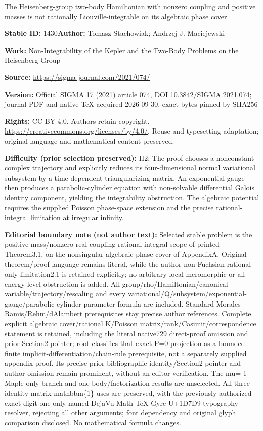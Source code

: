 \documentclass[11pt]{article}
\numberwithin{equation}{section}
\numberwithin{equation}{section}
\begin{document}
\begin{center}\Large The Heisenberg-group two-body Hamiltonian with nonzero coupling and positive masses is not rationally Liouville-integrable on its algebraic phase cover\end{center}
\noindent\textbf{Stable ID:} 1430\quad\textbf{Author:} Tomasz Stachowiak; Andrzej J. Maciejewski\par
\noindent\textbf{Work:} Non-Integrability of the Kepler and the Two-Body Problems on the Heisenberg Group\par
\noindent\textbf{Source:} \url{https://sigma-journal.com/2021/074/}\par
\noindent\textbf{Version:} Official SIGMA 17 (2021) article 074, DOI 10.3842/SIGMA.2021.074; journal PDF and native TeX acquired 2026-09-30, exact bytes pinned by SHA256\par
\noindent\textbf{Rights:} CC BY 4.0. Authors retain copyright. \url{https://creativecommons.org/licenses/by/4.0/}. Reuse and typesetting adaptation; original language and mathematical content preserved.\par
\noindent\textbf{Difficulty (prior selection preserved):} {\CJKfont H2: The proof chooses a nonconstant complex trajectory and explicitly reduces its four-dimensional normal variational subsystem by a time-dependent triangularizing matrix. An exponential gauge then produces a parabolic-cylinder equation with non-solvable differential Galois identity component, yielding the integrability obstruction. The algebraic potential requires the supplied Poisson phase-space extension and the precise rational-integral limitation at irregular infinity.}\par
\medskip\noindent\textbf{Editorial boundary note (not author text):} Selected stable problem is the positive-mass/nonzero real coupling rational-integral scope of printed Theorem3.1, on the nonsingular algebraic phase cover of AppendixA. Original theorem/proof language remains literal, while the author non-Fuchsian rational-only limitation2.1 is retained explicitly; no arbitrary local-meromorphic or all-energy-level obstruction is added. All group/rho/Hamiltonian/canonical variable/trajectory/rescaling and every variational/Q/subsystem/exponential-gauge/parabolic-cylinder parameter formula are included. Standard Morales–Ramis/Rehm/dAlambert prerequisites stay precise author references. Complete explicit algebraic cover/rational K/Poisson matrix/rank/Casimir/correspondence statement is retained, including the literal native729 direct-proof omission and prior Section2 pointer; root classifies that exact P=0 projection as a bounded finite implicit-differentiation/chain-rule prerequisite, not a separately supplied appendix proof. Its precise prior bibliographic identity/Section2 pointer and author omission remain prominent, without an editor verification. The mu=-1 Maple-only branch and one-body/factorization results are unselected. All three identity-matrix mathbbm\{1\} uses are preserved, with the previously authorized exact digit-one-only named DejaVu Math TeX Gyre U+1D7D9 typography resolver, rejecting all other arguments; font dependency and original glyph comparison disclosed. No mathematical formula changes.\par
\end{document}
